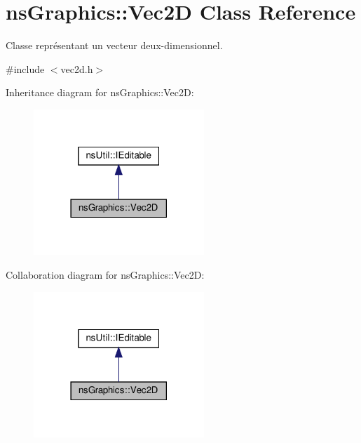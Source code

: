 \hypertarget{classns_graphics_1_1_vec2_d}{}\section{ns\+Graphics\+:\+:Vec2D Class Reference}
\label{classns_graphics_1_1_vec2_d}


Classe représentant un vecteur deux-\/dimensionnel.  




{\ttfamily \#include $<$vec2d.\+h$>$}



Inheritance diagram for ns\+Graphics\+:\+:Vec2D\+:
\nopagebreak
\begin{figure}[H]
\begin{center}
\leavevmode
\includegraphics[width=182pt]{classns_graphics_1_1_vec2_d__inherit__graph}
\end{center}
\end{figure}


Collaboration diagram for ns\+Graphics\+:\+:Vec2D\+:
\nopagebreak
\begin{figure}[H]
\begin{center}
\leavevmode
\includegraphics[width=182pt]{classns_graphics_1_1_vec2_d__coll__graph}
\end{center}
\end{figure}
